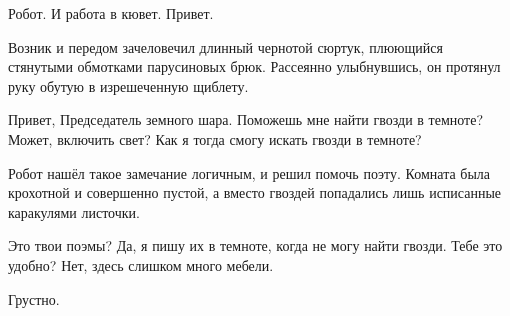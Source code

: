 {\small \begin{dialog}
\X Робот. И работа в кювет. Привет.
\end{dialog}

\begin{monolog}
Возник и передом зачеловечил длинный чернотой сюртук, плюющийся стянутыми обмотками парусиновых брюк. Рассеянно улыбнувшись, он протянул руку обутую в изрешеченную щиблету.
\end{monolog}

\begin{dialog}
\R Привет, Председатель земного шара.
\X Поможешь мне найти гвозди в темноте?
\R Может, включить свет?
\X Как я тогда смогу искать гвозди в темноте?
\end{dialog}

\begin{monolog}
Робот нашёл такое замечание логичным, и решил помочь поэту. Комната была крохотной и совершенно пустой, а вместо гвоздей попадались лишь исписанные каракулями листочки.
\end{monolog}

\begin{dialog}
\R Это твои поэмы?
\X Да, я пишу их в темноте, когда не могу найти гвозди.
\R Тебе это удобно?
\X Нет, здесь слишком много мебели.
\end{dialog}

\begin{dialog}
\R Грустно.
\end{dialog}}